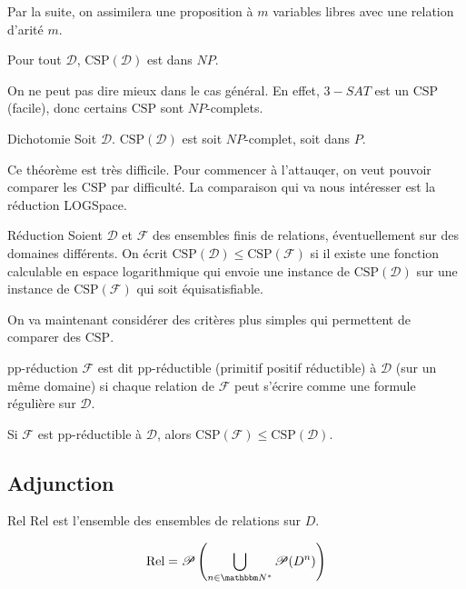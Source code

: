 \documentclass[12pt]{article}
\newcommand\Rel{\text{Rel}}
\renewcommand\P{\mathscr{P}}
\newcommand\csp{\text{CSP}}
\begin{document}
Par la suite, on assimilera une proposition à $m$ variables libres avec une relation
d'arité $m$.

\begin{lem}
    Pour tout $\mathcal{D}$, $\csp(\mathcal{D})$ est dans $NP$.

    On ne peut pas dire mieux dans le cas général. En effet, $3-SAT$ est un $\csp$
    (facile), donc certains $\csp$ sont $NP$-complets.
\end{lem}

\begin{theo}{Dichotomie}
    Soit $\mathcal{D}$. $\csp(\mathcal{D})$ est soit $NP$-complet, soit dans $P$.
\end{theo}

Ce théorème est très difficile. Pour commencer à l'attauqer, on veut pouvoir comparer les
$\csp$ par difficulté. La comparaison qui va nous intéresser est la réduction LOGSpace.

\begin{defi}{Réduction}
    Soient $\mathcal{D}$ et $\mathcal{F}$ des ensembles finis de relations, éventuellement
    sur des domaines différents. On écrit $\csp(\mathcal{D})\leq\csp(\mathcal{F})$ si il
    existe une fonction calculable en espace logarithmique qui envoie une instance de
    $\csp(\mathcal{D})$ sur une instance de $\csp(\mathcal{F})$ qui soit équisatisfiable.
\end{defi}

On va maintenant considérer des critères plus simples qui permettent de comparer des
$\csp$.

\begin{defi}{pp-réduction}
    $\mathcal{F}$ est dit pp-réductible (primitif positif réductible) à
    $\mathcal{D}$ (sur un même domaine) si chaque relation de $\mathcal{F}$ peut
    s'écrire comme une formule régulière sur $\mathcal{D}$.
\end{defi}

\begin{lem}
    Si $\mathcal{F}$ est pp-réductible à $\mathcal{D}$, alors
    $\csp(\mathcal{F})\leq\csp(\mathcal{D})$.
\end{lem}

\subsection{Adjunction}

\begin{defi}{$\Rel$}
    $\Rel$ est l'ensemble des ensembles de relations sur $D$.

    \[\Rel = \P\left(\bigcup_{n\in\N^*} \P(D^n)\right)\]
\end{defi}
\end{document}
